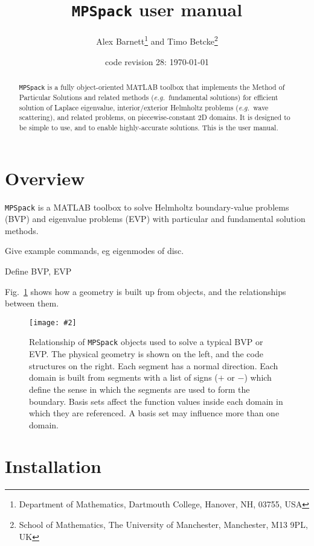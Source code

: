 \documentclass[12pt]{article}
\newcommand{\bfi}{\begin{figure}}
\newcommand{\efi}{\end{figure}}
\newcommand{\ca}[2]{\caption{#1 \label{#2}}}
\newcommand{\ig}[2]{\texttt{[image: \#2]}}
\newcommand{\eg}{{\it e.g.\ }}
\begin{document}
\title{{\tt MPSpack} user manual}
\author{Alex Barnett\footnote{Department of Mathematics, Dartmouth College, Hanover, NH, 03755, USA}
and Timo Betcke\footnote{School
of Mathematics, The University of Manchester,
  Manchester, M13 9PL, UK}}
\date{code revision 28: \today}

\maketitle
\begin{abstract}
{\tt MPSpack} is a fully object-oriented MATLAB toolbox that implements the Method of Particular Solutions and related methods (\eg fundamental solutions) for efficient solution of Laplace eigenvalue, interior/exterior Helmholtz problems (\eg wave scattering), and related problems, on piecewise-constant 2D domains.
It is designed to be simple to use, and to enable highly-accurate solutions.
This is the user manual.
\end{abstract}

\section{Overview}

{\tt MPSpack} is a MATLAB toolbox to solve Helmholtz boundary-value
problems (BVP) and
eigenvalue problems (EVP) with particular and fundamental solution methods.

Give example commands, eg eigenmodes of disc.

Define BVP, EVP



Fig.~\ref{f:relat} shows how a geometry is built up from objects, and the
relationships between them.



\bfi %
\ig{width=\textwidth}{relat.eps}
\ca{Relationship of {\tt MPSpack}
objects used to solve a typical BVP or EVP.
The physical geometry is shown on the left, and the code structures on the
right.
Each segment has a normal direction. Each domain is built from
segments with a list of signs ($+$ or $-$) which define the sense in which
the segments are used to form the boundary.
Basis sets affect the function values inside each domain in which they
are referenced. A basis set may influence more than one domain.}{f:relat}
\efi

\section{Installation}
\end{document}
